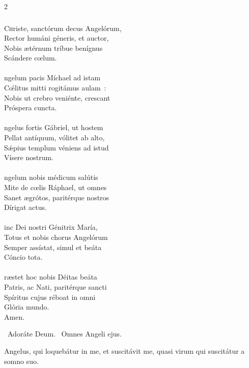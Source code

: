 \documentclass[9pt,twoside]{extarticle}
\begin{document}
\begin{multicols}{2}
{\subsubsection*{\center {}}
\lettrine{C}hriste, sanctórum decus Angelórum,\\
Rector humáni géneris, et auctor,\\
Nobis ætérnum tríbue benígnus\\
Scándere cœlum.\\
\\
ngelum pacis Míchael ad istam\\
Cœ́litus mitti rogitámus aulam~:\\
Nobis ut crebro veniénte, crescant\\
Próspera cuncta.\\
\\
ngelus fortis Gábriel, ut hostem\\
Pellat antíquum, vólitet ab alto,\\
Sǽpius templum véniens ad istud\\
Vísere nostrum.\\
\\
ngelum nobis médicum salútis\\
Mite de cœlis Ráphael, ut omnes\\
Sanet ægrótos, paritérque nostros\\
Dírigat actus.\\
\\
inc Dei nostri Génitrix María,\\
Totus et nobis chorus Angelórum\\
Semper assístat, simul et beáta\\
Cóncio tota.\\
\\
ræstet hoc nobis Déitas beáta\\
Patris, ac Nati, paritérque sancti\\
Spíritus cujus réboat in omni\\
Glória mundo.\\
Amen.

\begin{tightlist}{}
\item {}~Adoráte Deum. ~Omnes Angeli ejus.
\item {} Angelus, qui loquebátur in me, et suscitávit me, quasi virum qui suscitátur a somno suo.
\end{tightlist}

}
\end{multicols}
\end{document}
